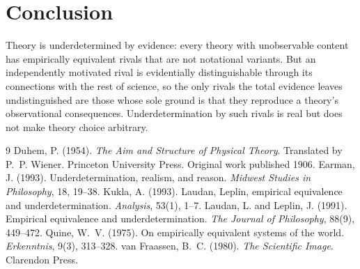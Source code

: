 \documentclass{situationist-preprint}
\begin{document}
\section{Conclusion}

Theory is underdetermined by evidence: every theory with unobservable content has empirically equivalent rivals that are not notational variants. But an independently motivated rival is evidentially distinguishable through its connections with the rest of science, so the only rivals the total evidence leaves undistinguished are those whose sole ground is that they reproduce a theory's observational consequences. Underdetermination by such rivals is real but does not make theory choice arbitrary.

\begin{thebibliography}{9}\small
{} Duhem, P. (1954). \emph{The Aim and Structure of Physical Theory}. Translated by P.~P. Wiener. Princeton University Press. Original work published 1906.
 Earman, J. (1993). Underdetermination, realism, and reason. \emph{Midwest Studies in Philosophy}, 18, 19--38.
 Kukla, A. (1993). Laudan, Leplin, empirical equivalence and underdetermination. \emph{Analysis}, 53(1), 1--7.
 Laudan, L. and Leplin, J. (1991). Empirical equivalence and underdetermination. \emph{The Journal of Philosophy}, 88(9), 449--472.
 Quine, W.~V. (1975). On empirically equivalent systems of the world. \emph{Erkenntnis}, 9(3), 313--328.
 van Fraassen, B.~C. (1980). \emph{The Scientific Image}. Clarendon Press.
\end{thebibliography}
\end{document}
